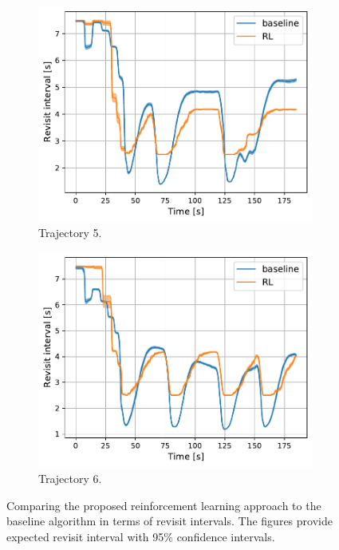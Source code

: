 \documentclass[english, 12pt, a4paper, elec, utf8, a-1b, online]{aaltothesis}
\begin{document}
\begin{figure}
\begin{subfigure}[b]{0.45\textwidth}
        \label{fig:RI_T4}
    \end{subfigure}
    \hfill
    \begin{subfigure}[b]{0.45\textwidth}
        \centering
        \includegraphics[width=\linewidth]{figures/benchmark/Simulations/revisit_intervals_4.pdf}
        \caption{Trajectory 5.}
        \label{fig:RI_T5}
    \end{subfigure}
    \hfill
    \begin{subfigure}[b]{0.45\textwidth}
        \centering
        \includegraphics[width=\linewidth]{figures/benchmark/Simulations/revisit_intervals_5.pdf}
        \caption{Trajectory 6.}
        \label{fig:RI_T6}
    \end{subfigure}
    \caption{Comparing the proposed reinforcement learning approach to the baseline algorithm in terms of revisit intervals.
    The figures provide expected revisit interval with 95\% confidence intervals.}
    \label{fig:revisit_interval_comparison}
\end{figure}
\end{document}
